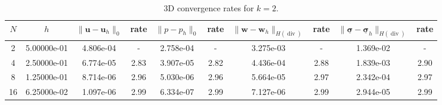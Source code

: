 \begin{table}[ht!]
\centering
\renewcommand{\arraystretch}{1.15}
\begin{tabular}{cccccccccc}
\toprule
$N$ & $h$ & $\|\mathbf{u}-\mathbf{u}_h\|_{0}$ & rate & $\|p-p_h\|_{0}$ & rate & $\|\mathbf{w}-\mathbf{w}_h\|_{H(\operatorname{div})}$ & rate & $\|\underline{\boldsymbol{\sigma}}-\underline{\boldsymbol{\sigma}}_h\|_{H(\operatorname{div})}$ & rate \\
\midrule
2 & 5.00000e-01 & 4.806e-04 & - & 2.758e-04 & - & 3.275e-03 & - & 1.369e-02 & - \\
4 & 2.50000e-01 & 6.774e-05 & 2.83 & 3.907e-05 & 2.82 & 4.436e-04 & 2.88 & 1.839e-03 & 2.90 \\
8 & 1.25000e-01 & 8.714e-06 & 2.96 & 5.030e-06 & 2.96 & 5.664e-05 & 2.97 & 2.342e-04 & 2.97 \\
16 & 6.25000e-02 & 1.097e-06 & 2.99 & 6.334e-07 & 2.99 & 7.127e-06 & 2.99 & 2.944e-05 & 2.99 \\
\bottomrule
\end{tabular}
\caption{3D convergence rates for $k=2$.}
\label{tab:biot_convergence_3d_k2}
\end{table}